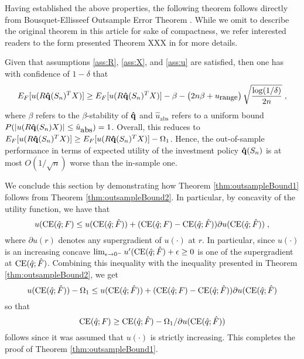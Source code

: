 Having established the above properties, the following theorem follows directly from
Bousquet-Ellisseef Outsample Error Theorem . While we omit to describe the original theorem in this article for sake of
compactness, we refer interested readers to the form presented Theorem XXX  in \cite{mohri2012foundations} for more details.

\begin{thm*}\label{thm:outsampleBound2}
  Given that assumptions \ref{ass:R}, \ref{ass:X}, and \ref{ass:u} are satisfied, then one
  has with confidence of $1-\delta$ that
  \[
    \Expect_\F[u(R\qhatOp(\Sn)^TX)] \geq \Expect_\F[u(R\qhatOp(\Sn)^TX)] - \beta -
    \left(2n\beta+\urange\right)\sqrt{\frac{\log(1/\delta)}{2n}}\;,
  \]
  where $\beta$ refers to the $\beta$-stability of ${\bold{{\hat{q}}}}$ and $\hat{u}_{\mbox{abs}}$
  refers to a uniform bound $P(|u(R{\bold{{\hat{q}}}}(S_n)X)|\leq \hat{u}_{\mbox{abs}})=1$.
  Overall, this reduces to
  $E_F[u(R{\bold{{\hat{q}}}}(S_n)^TX)] \geq E_F[u(R{\bold{{\hat{q}}}}(S_n)^TX)] -
  \Omega_1$. Hence, the out-of-sample performance in terms of expected utility of the
  investment policy ${\bold{{\hat{q}}}}(S_n)$ is at most $O(1/\sqrt{n})$ worse than the in-sample
  one.
\end{thm*}

We conclude this section by demonstrating how Theorem \ref{thm:outsampleBound1} follows
from Theorem \ref{thm:outsampleBound2}. In particular, by concavity of the utility
function, we have that
\[u(\operatorname{CE}({\hat{q}};F)\leq u(\operatorname{CE}({\hat{q}};{\hat{F}}))+(\operatorname{CE}({\hat{q}};F)-\operatorname{CE}({\hat{q}};{\hat{F}}))\partial
  u(\operatorname{CE}({\hat{q}};{\hat{F}}))\;,\] where $\partial u(r)$ denotes any supergradient of $u(\cdot)$
at $r$. In particular, since $u(\cdot)$ is an increasing concave
$\lim_{\epsilon\to0^-}u'(\operatorname{CE}({\hat{q}};{\hat{F}})+\epsilon\geq 0$ is one of the supergradient at
$\operatorname{CE}({\hat{q}};{\hat{F}})$. Combining this inequality with the inequality presented in Theorem
\ref{thm:outsampleBound2}, we get
\[ u(\operatorname{CE}({\hat{q}};{\hat{F}})) - \Omega_1 \leq
  u(\operatorname{CE}({\hat{q}};{\hat{F}}))+(\operatorname{CE}({\hat{q}};F)-\operatorname{CE}({\hat{q}};{\hat{F}}))\partial u(\operatorname{CE}({\hat{q}};{\hat{F}})\] so
that
\[ \operatorname{CE}({\hat{q}};F) \geq \operatorname{CE}({\hat{q}};{\hat{F}}) - \Omega_1/\partial u(\operatorname{CE}({\hat{q}};{\hat{F}}))\] follows
since it was assumed that $u(\cdot)$ is strictly increasing. This completes the proof of
Theorem \ref{thm:outsampleBound1}.



